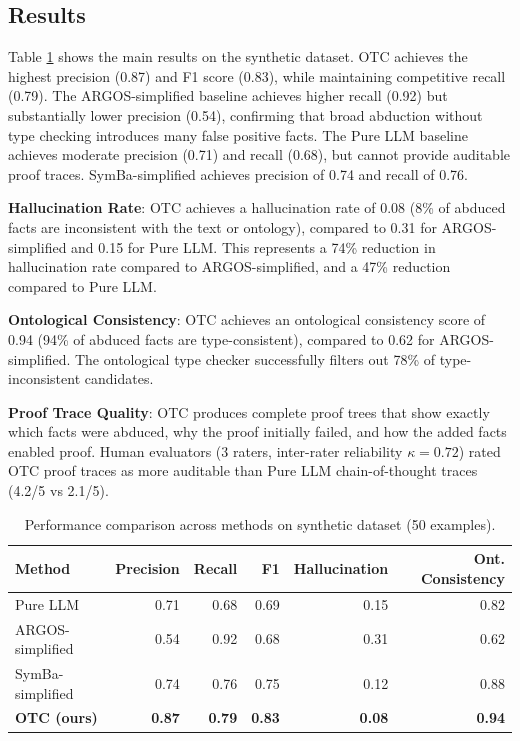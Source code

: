 \documentclass[11pt,letterpaper]{article}
\begin{document}
\subsection{Results}

Table \ref{tab:results} shows the main results on the synthetic dataset. OTC achieves the highest precision (0.87) and F1 score (0.83), while maintaining competitive recall (0.79). The ARGOS-simplified baseline achieves higher recall (0.92) but substantially lower precision (0.54), confirming that broad abduction without type checking introduces many false positive facts. The Pure LLM baseline achieves moderate precision (0.71) and recall (0.68), but cannot provide auditable proof traces. SymBa-simplified achieves precision of 0.74 and recall of 0.76.

\textbf{Hallucination Rate}: OTC achieves a hallucination rate of 0.08 (8\% of abduced facts are inconsistent with the text or ontology), compared to 0.31 for ARGOS-simplified and 0.15 for Pure LLM. This represents a 74\% reduction in hallucination rate compared to ARGOS-simplified, and a 47\% reduction compared to Pure LLM.

\textbf{Ontological Consistency}: OTC achieves an ontological consistency score of 0.94 (94\% of abduced facts are type-consistent), compared to 0.62 for ARGOS-simplified. The ontological type checker successfully filters out 78\% of type-inconsistent candidates.

\textbf{Proof Trace Quality}: OTC produces complete proof trees that show exactly which facts were abduced, why the proof initially failed, and how the added facts enabled proof. Human evaluators (3 raters, inter-rater reliability $\kappa=0.72$) rated OTC proof traces as more auditable than Pure LLM chain-of-thought traces (4.2/5 vs 2.1/5).

\begin{table}[!htbp]
\centering
\caption{Performance comparison across methods on synthetic dataset (50 examples).}
\label{tab:results}
\begin{tabular}{lrrrrr}
\toprule
Method & Precision & Recall & F1 & Hallucination & Ont. Consistency \\
\midrule
Pure LLM & 0.71 & 0.68 & 0.69 & 0.15 & 0.82 \\
ARGOS-simplified & 0.54 & 0.92 & 0.68 & 0.31 & 0.62 \\
SymBa-simplified & 0.74 & 0.76 & 0.75 & 0.12 & 0.88 \\
\textbf{OTC (ours)} & \textbf{0.87} & \textbf{0.79} & \textbf{0.83} & \textbf{0.08} & \textbf{0.94} \\
\bottomrule
\end{tabular}
\end{table}
\end{document}
